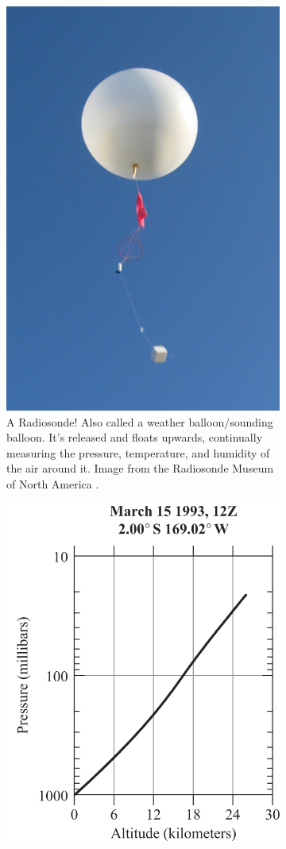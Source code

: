 \begin{figure}[H]
    \begin{subfigure}{0.5\linewidth}
        \centering
        \includegraphics[width=0.6\linewidth]{Figures/Thermodynamics/Radiosonde 2.jpg}
    \caption{A Radiosonde! Also called a weather balloon/sounding balloon. It's released and floats upwards, continually measuring the pressure, temperature, and humidity of the air around it. Image from the Radiosonde Museum of North America \cite{Radiosonde}.}
    \end{subfigure}
    \hfill
    \begin{subfigure}{0.45\linewidth}
        \centering
        \includegraphics[width=0.8\linewidth]{Figures/Thermodynamics/Earth Radiosonde Pressure.png}

\end{subfigure}
\end{figure}
